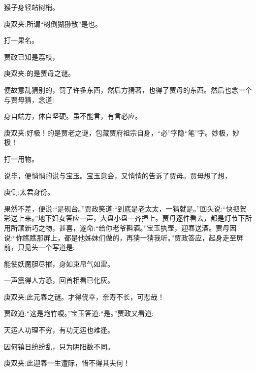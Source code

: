 \begin{parag}
    猴子身轻站树梢。\begin{note}庚双夹:所谓“树倒猢狲散”是也。\end{note}打一果名。
\end{parag}


\begin{parag}
    贾政已知是荔枝，\begin{note}庚双夹:的是贾母之谜。\end{note}便故意乱猜别的，罚了许多东西，然后方猜著，也得了贾母的东西。然后也念一个与贾母猜，念道:
\end{parag}


\begin{parag}
    身自端方，体自坚硬。虽不能言，有言必应。\begin{note}庚双夹:好极！的是贾老之谜，包藏贾府祖宗自身，“必”字隐“笔”字。妙极，妙极！\end{note}打一用物。
\end{parag}


\begin{parag}
    说毕，便悄悄的说与宝玉。宝玉意会，又悄悄的告诉了贾母。贾母想了想，\begin{note}庚侧:太君身份。\end{note}果然不差，便说:“是砚台。”贾政笑道:“到底是老太太，一猜就是。”回头说:“快把贺彩送上来。”地下妇女答应一声，大盘小盘一齐捧上。贾母逐件看去，都是灯节下所用所顽新巧之物，甚喜，遂命:“给你老爷斟酒。”宝玉执壶，迎春送酒。贾母因说:“你瞧瞧那屏上，都是他姊妹们做的，再猜一猜我听。”贾政答应，起身走至屏前，只见头一个写道是:
\end{parag}


\begin{poem}
    \begin{pl}能使妖魔胆尽摧，身如束帛气如雷。\end{pl}

    \begin{pl}一声震得人方恐，回首相看已化灰。\end{pl}
    \begin{note}庚双夹:此元春之谜。才得侥幸，奈寿不长，可悲哉！\end{note}
\end{poem}


\begin{parag}
    贾政道:“这是炮竹嗄。”宝玉答道:“是。”贾政又看道:
\end{parag}


\begin{poem}
    \begin{pl}天运人功理不穷，有功无运也难逢。\end{pl}

    \begin{pl}因何镇日纷纷乱，只为阴阳数不同。\end{pl}
    \begin{note}庚双夹:此迎春一生遭际，惜不得其夫何！\end{note}
\end{poem}


